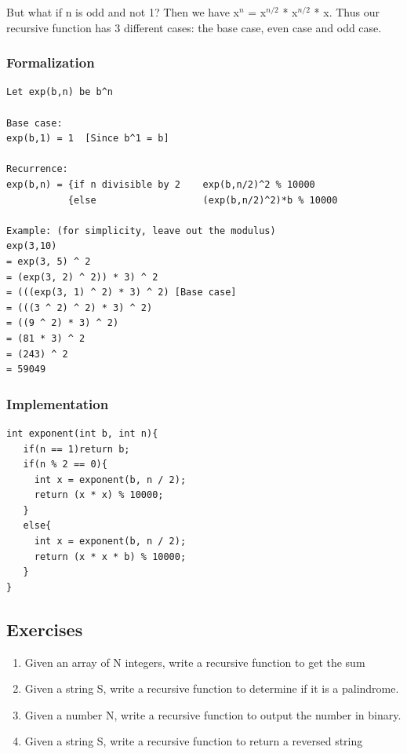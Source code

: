 \documentclass[11pt,oneside]{book}
\begin{document}
But what if n is odd and not 1? Then we have x$^{n}$ = x$^{n/2}$ * x$^{n/2}$ * x. Thus our recursive function has 3 different cases: the base case, even case and odd case.

\subsubsection{Formalization}

\begin{lstlisting}
Let exp(b,n) be b^n

Base case:
exp(b,1) = 1  [Since b^1 = b]

Recurrence:
exp(b,n) = {if n divisible by 2    exp(b,n/2)^2 % 10000
           {else                   (exp(b,n/2)^2)*b % 10000

Example: (for simplicity, leave out the modulus)
exp(3,10)
= exp(3, 5) ^ 2
= (exp(3, 2) ^ 2)) * 3) ^ 2
= (((exp(3, 1) ^ 2) * 3) ^ 2) [Base case]
= (((3 ^ 2) ^ 2) * 3) ^ 2)
= ((9 ^ 2) * 3) ^ 2)
= (81 * 3) ^ 2
= (243) ^ 2
= 59049
\end{lstlisting}

\subsubsection{Implementation}

\begin{lstlisting}
int exponent(int b, int n){
   if(n == 1)return b;
   if(n % 2 == 0){
     int x = exponent(b, n / 2);
     return (x * x) % 10000;
   }
   else{
     int x = exponent(b, n / 2);
     return (x * x * b) % 10000;
   }
}

\end{lstlisting}

\subsection{Exercises}

\begin{enumerate}
\item Given an array of N integers, write a recursive function to get the sum
\item Given a string S, write a recursive function to determine if it is a palindrome.
\item Given a number N, write a recursive function to output the number in binary.
\item Given a string S, write a recursive function to return a reversed string
\end{enumerate}
\end{document}

